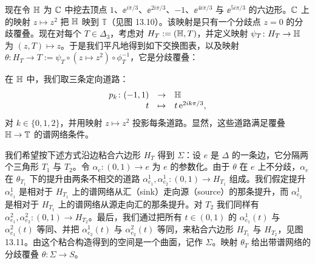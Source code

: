 现在令 $\mathbb{H}$ 为 $\mathbb{C}$ 中挖去顶点 $1$、$\ee^{i\pi/3}$、$\ee^{2i\pi/3}$、$-1$、$\ee^{4i\pi/3}$ 与 $\ee^{5i\pi/3}$ 的六边形。$\mathbb{C}$ 上的映射 $z\mapsto z^2$ 把 $\mathbb{H}$ 映到 $\mathbb{T}$（见图 13.10）。该映射是只有一个分歧点 $z=0$ 的分歧覆叠。现在对每个 $T\in\Delta_3$，考虑对 $H_T:=(\mathbb{H},T)$，并定义映射 $\psi_T\colon H_T\to\mathbb{H}$ 为 $(z,T)\mapsto z$。于是我们平凡地得到如下交换图表，以及映射 $\theta\colon H_T\to T:=\psi_T\circ(z\mapsto z^2)\circ\phi_T^{-1}$，它是分歧覆叠：
\begin{center}
\end{center}

在 $\mathbb{H}$ 中，我们取三条定向道路：
\[
\begin{array}{rcl}
p_k\colon(-1,1)&\to&\mathbb{H}\\
t&\mapsto&t\,\mathrm{e}^{2ik\pi/3},
\end{array}
\]
对 $k\in\{0,1,2\}$，并用映射 $z\mapsto z^2$ 投影每条道路。显然，这些道路满足覆叠 $\mathbb{H}\to\mathbb{T}$ 的谱网络条件。


我们希望按下述方式沿边粘合六边形 $H_T$ 得到 $\Sigma$：设 $e$ 是 $\Delta$ 的一条边，它分隔两个三角形 $T_1$ 与 $T_2$。令 $\alpha_e\colon(0,1)\to e$ 为 $e$ 的参数化。由于 $\theta$ 在 $e$ 上不分歧，$\alpha_e$ 在 $\theta_{T_1}$ 下的提升由两条不相交的道路 $\alpha^1_{e_1},\alpha^1_{e_2}\colon(0,1)\to H_{T_1}$ 组成。我们假定提升 $\alpha^1_{e_1}$ 是相对于 $H_{T_1}$ 上的谱网络从汇（sink）走向源（source）的那条提升，而 $\alpha^1_{e_2}$ 是相对于 $H_{T_1}$ 上的谱网络从源走向汇的那条提升。对 $T_2$ 我们同样有 $\alpha^2_{e_1},\alpha^2_{e_2}\colon(0,1)\to H_{T_2}$。最后，我们通过把所有 $t\in(0,1)$ 的 $\alpha^1_{e_1}(t)$ 与 $\alpha^2_{e_1}(t)$ 等同、并把 $\alpha^1_{e_2}(t)$ 与 $\alpha^2_{e_2}(t)$ 等同，来粘合六边形 $H_{T_1}$ 与 $H_{T_2}$，见图 13.11。由这个粘合构造得到的空间是一个曲面，记作 $\Sigma$。映射 $\theta_T$ 给出带谱网络的分歧覆叠 $\theta\colon\Sigma\to S$。


